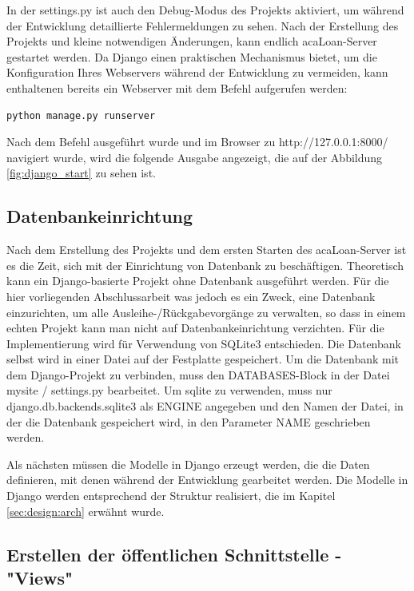 In der settings.py ist auch den Debug-Modus des Projekts aktiviert, um während der Entwicklung detaillierte Fehlermeldungen zu sehen.  Nach der Erstellung des Projekts und kleine notwendigen Änderungen, kann endlich acaLoan-Server gestartet werden. Da Django einen praktischen Mechanismus bietet, um die Konfiguration Ihres Webservers während der Entwicklung zu vermeiden, kann enthaltenen bereits ein Webserver mit dem Befehl aufgerufen werden: 
\begin{lstlisting}
python manage.py runserver
\end{lstlisting}
Nach dem Befehl ausgeführt wurde und im Browser zu http://127.0.0.1:8000/ navigiert wurde, wird die folgende Ausgabe angezeigt, die auf der Abbildung \ref{fig:django_start} zu sehen ist.
 
\subsection{Datenbankeinrichtung}
\label{sec:server:database}
Nach dem Erstellung des Projekts und dem ersten Starten des acaLoan-Server ist es die Zeit, sich mit der Einrichtung von Datenbank zu beschäftigen. Theoretisch kann ein Django-basierte Projekt ohne Datenbank ausgeführt werden. Für die hier vorliegenden Abschlussarbeit was jedoch es ein Zweck, eine Datenbank einzurichten, um alle Ausleihe-/Rückgabevorgänge zu verwalten, so dass in einem echten Projekt kann man nicht auf Datenbankeinrichtung verzichten. Für die Implementierung wird für Verwendung von SQLite3 entschieden. Die Datenbank selbst wird in einer Datei auf der Festplatte gespeichert. Um die Datenbank mit dem Django-Projekt zu verbinden, muss den DATABASES-Block in der Datei mysite / settings.py bearbeitet. Um sqlite zu verwenden, muss nur django.db.backends.sqlite3 als ENGINE angegeben und den Namen der Datei, in der die Datenbank gespeichert wird, in den Parameter NAME geschrieben werden\cite{website:15}.

Als nächsten müssen die Modelle in Django erzeugt werden, die die Daten definieren, mit denen während der Entwicklung gearbeitet werden. Die Modelle in Django werden entsprechend der Struktur realisiert, die im Kapitel \ref{sec:design:arch} erwähnt wurde. 



\subsection{Erstellen der öffentlichen Schnittstelle - "Views"}
\label{sec:server:views}

